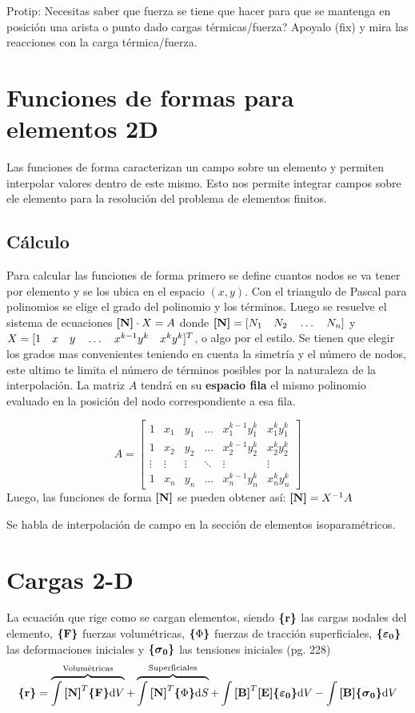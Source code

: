Protip: Necesitas saber que fuerza se tiene que hacer para que se mantenga en posición una arista o punto dado cargas térmicas/fuerza? Apoyalo (fix) y mira las reacciones con la carga térmica/fuerza.






\section{Funciones de formas para elementos 2D}
Las funciones de forma caracterizan un campo sobre un elemento y permiten interpolar valores dentro de este mismo. Esto nos permite integrar campos sobre ele elemento para la resolución del problema de elementos finitos. 

\subsection*{Cálculo}
Para calcular las funciones de forma primero se define cuantos nodos se va tener por elemento y se los ubica en el espacio $(x,y)$. Con el triangulo de Pascal para polinomios se elige el grado del polinomio y los términos. Luego se resuelve el sistema de ecuaciones $\boldsymbol{[}\mathbf{N} \boldsymbol{]}\cdot X= A$ donde $\boldsymbol{[}\mathbf{N} \boldsymbol{]}=[N_1\ \ \  N_2 \ \ \  \ldots\ \ \  N_n]$ y $X=[1\ \ \  x\ \ \  y \ \ \ \ldots\ \ \  x^{k-1}y^{k} \ \ \  x^{k}y^{k}]^T$, o algo por el estilo. Se tienen que elegir los grados mas convenientes teniendo en cuenta la simetría y el número de nodos, este ultimo te limita el número de términos posibles por la naturaleza de la interpolación. La matriz $A$ tendrá en su \textbf{espacio fila} el mismo polinomio evaluado en la posición del nodo correspondiente a esa fila.

\[
A=
\begin{bmatrix}
1 & x_1 & y_1 & \dots  & x_{1}^{k-1}y_1^{k} & x_{1}^{k}y_1^{k} \\
1 & x_2 & y_2 & \dots  & x_{2}^{k-1}y_2^{k} & x_{2}^{k}y_2^{k} \\
\vdots & \vdots & \vdots & \ddots & \vdots& \vdots \\
1 & x_n & y_n & \dots  & x_{n}^{k-1}y_n^{k} & x_{n}^{k}y_n^{k}
\end{bmatrix}
\]
Luego, las funciones de forma $\boldsymbol{[}\mathbf{N} \boldsymbol{]}$ se pueden obtener así: $\boldsymbol{[}\mathbf{N} \boldsymbol{]}=X^{-1} A$

Se habla de interpolación de campo en la sección de elementos isoparamétricos.

\section*{Cargas 2-D}
La ecuación que rige como se cargan elementos, siendo $\boldsymbol{\{ }\mathbf{r} \boldsymbol{\}}$ las cargas nodales del elemento, $\boldsymbol{\{ }\mathbf{F} \boldsymbol{\}}$ fuerzas volumétricas, $\boldsymbol{\{ } \Phi \boldsymbol{\} }$ fuerzas de tracción superficiales, $\boldsymbol{\{ }\mathbf{\boldsymbol{\varepsilon}_0} \boldsymbol{\}}$ las deformaciones iniciales y $\boldsymbol{\{ }\mathbf{\boldsymbol{\sigma}_0} \boldsymbol{\}}$ las tensiones iniciales (pg. 228)
\begin{equation} \label{eq:CargasGenerales}
\boldsymbol{\{ }\mathbf{r} \boldsymbol{\}}=\overbrace{\int \boldsymbol{[}\mathbf{N} \boldsymbol{]}^T \boldsymbol{\{ }\mathbf{F} \boldsymbol{\}} \textrm{d} V}^{\text{Volumétricas}} + \overbrace{\int \boldsymbol{[}\mathbf{N} \boldsymbol{]}^T \boldsymbol{\{ } \Phi \boldsymbol{\} } \textrm{d} S}^{\text{Superficiales}}+\int \boldsymbol{[}\mathbf{B} \boldsymbol{]}^T \boldsymbol{[}\mathbf{E} \boldsymbol{]} \boldsymbol{\{ }\mathbf{\boldsymbol{\varepsilon}_0} \boldsymbol{\}} \textrm{d} V- \int \boldsymbol{[}\mathbf{B} \boldsymbol{]} \boldsymbol{\{ }\mathbf{\boldsymbol{\sigma}_0} \boldsymbol{\}} \textrm{d} V
\end{equation}



